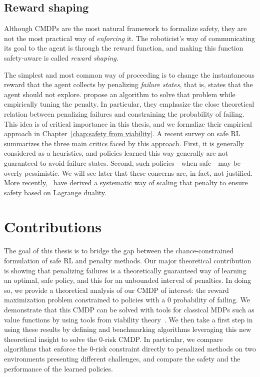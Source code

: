 	\subsection{Reward shaping} 
	Although CMDPs are the most natural framework to formalize safety, they are not the most practical way of\emph{ enforcing} it. The roboticist's way of communicating its goal to the agent is through the reward function, and making this function safety-aware is called\emph{ reward shaping}.\par
	The simplest and most common way of proceeding is to change the instantaneous reward that the agent collects by penalizing\emph{ failure states}, that is, states that the agent should not explore. \textcite{geibel2005risk} propose an algorithm to solve that problem while empirically tuning the penalty. In particular, they emphasize the close theoretical relation between penalizing failures and constraining the probability of failing. This idea is of critical importance in this thesis, and we formalize their empirical approach in Chapter~\ref{chap:safety from viability}. A recent survey on safe RL~\cite{garcia2015comprehensive} summarizes the three main critics faced by this approach. First, it is generally considered as a heuristics, and policies learned this way generally are not guaranteed to avoid failure states. Second, such policies - when safe - may be overly pessimistic. We will see later that these concerns are, in fact, not justified. More recently,~\textcite{paternain2019safe} have derived a systematic way of scaling that penalty to ensure safety based on Lagrange duality.
\section{Contributions}
	The goal of this thesis is to bridge the gap between the chance-constrained formulation of safe RL and penalty methods. Our major theoretical contribution is showing that penalizing failures is a theoretically guaranteed way of learning an optimal, safe policy, and this for an unbounded interval of penalties. In doing so, we provide a theoretical analysis of our CMDP of interest: the reward maximization problem constrained to policies with a $0$ probability of failing. We demonstrate that this CMDP can be solved with tools for classical MDPs such as value functions by using tools from viability theory~\cite{aubin2011viability}. We then take a first step in using these results by defining and benchmarking algorithms leveraging this new theoretical insight to solve the $0$-risk CMDP. In particular, we compare algorithms that enforce the $0$-risk constraint directly to penalized methods on two environments presenting different challenges, and compare the safety and the performance of the learned policies.
